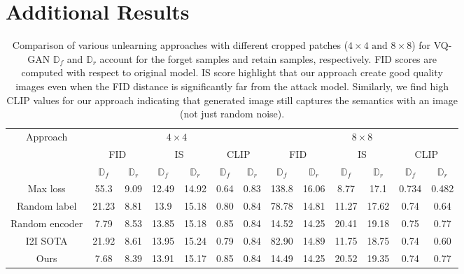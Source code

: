 \onecolumn
\setcounter{section}{0}
\maketitlesupplementary
\section{Additional Results}
\label{sec:exp_normal_data}

\begin{table*}[h]
    \centering
    \begin{tabular}{ccccccc||cccccc}
      \toprule
      \multirow{3}{*}{Approach} & \multicolumn{6}{c||}{$4\times4$} & \multicolumn{6}{c}{$8\times8$} \\
      & \multicolumn{2}{c}{FID} & \multicolumn{2}{c}{IS} & \multicolumn{2}{c||}{CLIP} & \multicolumn{2}{c}{FID} & \multicolumn{2}{c}{IS} & \multicolumn{2}{c}{CLIP} \\ \cline{2-13}
      & $\mathbb{D}_f$ & $\mathbb{D}_r$ & $\mathbb{D}_f$ & $\mathbb{D}_r$ & $\mathbb{D}_f$ & $\mathbb{D}_r$ & $\mathbb{D}_f$ & $\mathbb{D}_r$ & $\mathbb{D}_f$ & $\mathbb{D}_r$ & $\mathbb{D}_f$ & $\mathbb{D}_r$ \\
      \hline
      Max loss & 55.3 & 9.09 & 12.49 & 14.92 & 0.64 & 0.83 & 138.8 & 16.06 & 8.77 & 17.1 & 0.734 & 0.482 \\
      Random label & 21.23 & 8.81 & 13.9 & 15.18 & 0.80 & 0.84 & 78.78 & 14.81 & 11.27 & 17.62 & 0.74 & 0.64 \\
      Random encoder & 7.79 & 8.53 & 13.85 & 15.18 & 0.85 & 0.84 & 14.52 & 14.25 & 20.41 & 19.18 & 0.75 & 0.77 \\
      I2I SOTA & 21.92 & 8.61 & 13.95 & 15.24 & 0.79 & 0.84 & 82.90 & 14.89 & 11.75 & 18.75 & 0.74 & 0.60 \\
      Ours & 7.68 & 8.39 & 13.91 & 15.17 & 0.85 & 0.84 & 14.49 & 14.25 & 20.52 & 19.35 & 0.74 & 0.77 \\
      \bottomrule
    \end{tabular}
    \caption{Comparison of various unlearning approaches with different cropped patches ($4\times4 \text{ and } 8\times8$) for VQ-GAN $\mathbb{D}_f$ and $\mathbb{D}_r$ account for the forget samples and retain samples, respectively. FID scores are computed with respect to original model. IS score highlight that our approach create good quality images even when the FID distance is significantly far from the attack model. Similarly, we find high CLIP values for our approach indicating that generated image still captures the semantics with an image (not just random noise).}
    \label{tab:VQ-GAN_results_original}
\end{table*}

